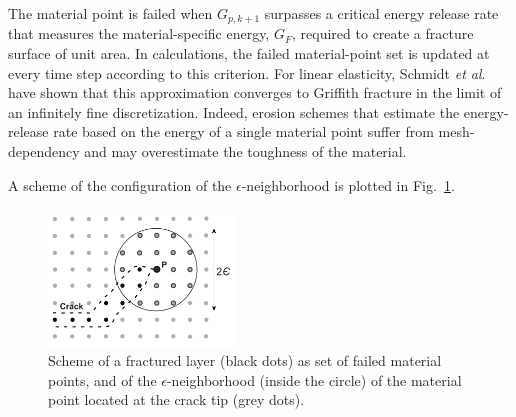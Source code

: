 \documentclass[applsci,journal,article,submit,moreauthors,pdftex]{Definitions/mdpi}
\begin{document}
The material point is failed when $G_{p,k+1} $ surpasses a critical energy release rate that measures the material-specific energy, $G_F$, required to create a fracture surface of unit area. In calculations, the failed material-point set is updated at every time step according to  this criterion. For linear elasticity, Schmidt \textit{et al}.~\cite{schmidt09} have shown that this approximation converges to Griffith fracture in the limit of an infinitely fine discretization. 
Indeed, erosion schemes that estimate the energy-release rate based on the energy of a single material point suffer from mesh-dependency and may overestimate the toughness of the material.

A scheme of the configuration of the $\epsilon$-neighborhood is plotted in Fig.~\ref{fig3}.
\begin{figure}
\centering
\includegraphics[width=0.44\textwidth]{Figs/eroded_neighbors_2.pdf}
\caption{Scheme of a fractured layer (black dots) as set of failed material points, and of the $\epsilon$-neighborhood (inside the circle) of the material point located at the crack tip (grey dots).}
\label{fig3}
\end{figure}
\end{document}
